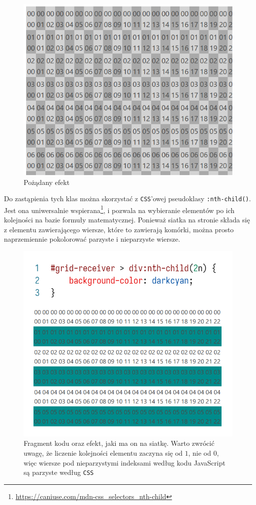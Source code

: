 \documentclass[licencjacka]{pracadypl}
\begin{document}
\begin{figure}[H]
  \centering
  \includegraphics[width=\linewidth/\real{1.5}]{images/ui-grid-darken.png}
  \caption{Pożądany efekt}
  \label{fig:ui-grid-darken}
\end{figure}

Do zastąpienia tych klas można skorzystać z \texttt{CSS}'owej pseudoklasy \texttt{:nth-child()}. Jest ona uniwersalnie wspierana\footnote{\url{https://caniuse.com/mdn-css_selectors_nth-child}}, i pozwala na wybieranie elementów po ich kolejności na bazie formuły matematycznej. Ponieważ siatka na stronie składa się z elementu zawierającego wiersze, które to zawierają komórki, można prosto naprzemiennie pokolorować parzyste i nieparzyste wiersze.

\begin{figure}[H]
  \centering
  \includegraphics[width=\linewidth/\real{1.6}]{images/codeui-row-coloring.png}
  \caption{Fragment kodu oraz efekt, jaki ma on na siatkę. Warto zwrócić uwagę, że liczenie kolejności elementu zaczyna się od $1$, nie od $0$, więc wiersze pod nieparzystymi indeksami według kodu JavaScript są parzyste według \texttt{CSS}}
  \label{fig:codeui-row-coloring}
\end{figure}
\end{document}
